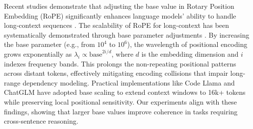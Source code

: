 \label{sec:appendix_rope}
Recent studies demonstrate that adjusting the base value in Rotary Position Embedding (RoPE) significantly enhances language models' ability to handle long-context sequences \citep{ntkawarerope}. 
The scalability of RoPE for long-context has been systematically demonstrated through base parameter adjustments \citep{liuscaling}.
By increasing the base parameter (e.g., from $10^4$ to $10^6$), the wavelength of positional encoding grows exponentially as \( \lambda_i \propto \text{base}^{2i/d} \), where \(d\) is the embedding dimension and \(i\) indexes frequency bands. This prolongs the non-repeating positional patterns across distant tokens, effectively mitigating encoding collisions that impair long-range dependency modeling. Practical implementations like Code Llama \citep{grattafiori2023code} and ChatGLM \citep{glm2024chatglm} have adopted base scaling to extend context windows to 16k+ tokens while preserving local positional sensitivity. Our experiments align with these findings, showing that larger base values improve coherence in tasks requiring cross-sentence reasoning.
